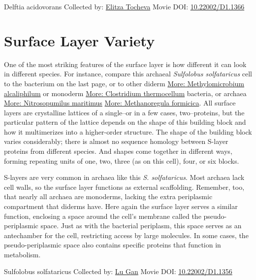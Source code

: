 \documentclass[]{tufte-book}
\begin{document}
\label{fig:2-6a}Delftia acidovorans Collected by: \protect\hyperlink{elitza_tocheva}{Elitza Tocheva} Movie DOI: \href{https://doi.org/10.22002/D1.1366}{10.22002/D1.1366}

\hypertarget{surface-layer-variety}{%
\section{Surface Layer Variety}\label{surface-layer-variety}}

One of the most striking features of the surface layer is how different it can look in different species. For instance, compare this archaeal \emph{Sulfolobus solfataricus} cell to the bacterium on the last page, or to other diderm \protect\hyperlink{Methylomicrobium_alcaliphilum}{More: Methylomicrobium alcaliphilum} or monoderm \protect\hyperlink{Clostridium_thermocellum}{More: Clostridium thermocellum} bacteria, or archaea \protect\hyperlink{Nitrosopumilus_maritimus}{More: Nitrosopumilus maritimus} \protect\hyperlink{Methanoregula_formicica}{More: Methanoregula formicica}. All surface layers are crystalline lattices of a single--or in a few cases, two--proteins, but the particular pattern of the lattice depends on the shape of this building block and how it multimerizes into a higher-order structure. The shape of the building block varies considerably; there is almost no sequence homology between S-layer proteins from different species. And shapes come together in different ways, forming repeating units of one, two, three (as on this cell), four, or six blocks.

S-layers are very common in archaea like this \emph{S. solfataricus}. Most archaea lack cell walls, so the surface layer functions as external scaffolding. Remember, too, that nearly all archaea are monoderms, lacking the extra periplasmic compartment that diderms have. Here again the surface layer serves a similar function, enclosing a space around the cell's membrane called the pseudo-periplasmic space. Just as with the bacterial periplasm, this space serves as an antechamber for the cell, restricting access by large molecules. In some cases, the pseudo-periplasmic space also contains specific proteins that function in metabolism.



\hypertarget{htmlwidget-d97984345519a7fa3087}{}

\label{fig:2-7}Sulfolobus solfataricus Collected by: \protect\hyperlink{lu_gan}{Lu Gan} Movie DOI: \href{https://doi.org/10.22002/D1.1356}{10.22002/D1.1356}
\end{document}
